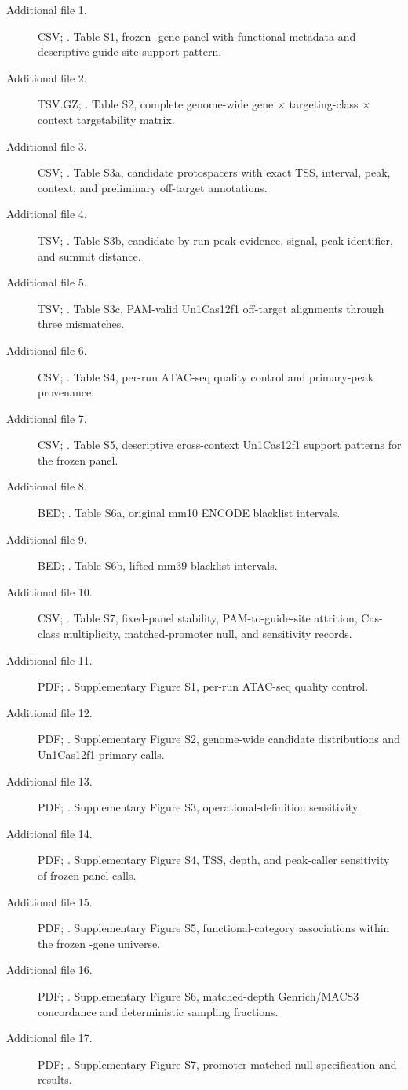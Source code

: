 \documentclass[11pt]{article}
\begin{document}
\begin{description}
\item[Additional file 1.] CSV; . Table S1, frozen \NPanel{}-gene panel with functional metadata and descriptive guide-site support pattern.
\item[Additional file 2.] TSV.GZ; . Table S2, complete genome-wide gene $\times$ targeting-class $\times$ context targetability matrix.
\item[Additional file 3.] CSV; . Table S3a, candidate protospacers with exact TSS, interval, peak, context, and preliminary off-target annotations.
\item[Additional file 4.] TSV; . Table S3b, candidate-by-run peak evidence, signal, peak identifier, and summit distance.
\item[Additional file 5.] TSV; . Table S3c, PAM-valid Un1Cas12f1 off-target alignments through three mismatches.
\item[Additional file 6.] CSV; . Table S4, per-run ATAC-seq quality control and primary-peak provenance.
\item[Additional file 7.] CSV; . Table S5, descriptive cross-context Un1Cas12f1 support patterns for the frozen panel.
\item[Additional file 8.] BED; . Table S6a, original mm10 ENCODE blacklist intervals.
\item[Additional file 9.] BED; . Table S6b, lifted mm39 blacklist intervals.
\item[Additional file 10.] CSV; . Table S7, fixed-panel stability, PAM-to-guide-site attrition, Cas-class multiplicity, matched-promoter null, and sensitivity records.
\item[Additional file 11.] PDF; . Supplementary Figure S1, per-run ATAC-seq quality control.
\item[Additional file 12.] PDF; . Supplementary Figure S2, genome-wide candidate distributions and Un1Cas12f1 primary calls.
\item[Additional file 13.] PDF; . Supplementary Figure S3, operational-definition sensitivity.
\item[Additional file 14.] PDF; . Supplementary Figure S4, TSS, depth, and peak-caller sensitivity of frozen-panel calls.
\item[Additional file 15.] PDF; . Supplementary Figure S5, functional-category associations within the frozen \NPanel{}-gene universe.
\item[Additional file 16.] PDF; . Supplementary Figure S6, matched-depth Genrich/MACS3 concordance and deterministic sampling fractions.
\item[Additional file 17.] PDF; . Supplementary Figure S7, promoter-matched null specification and results.
\end{description}
\end{document}
